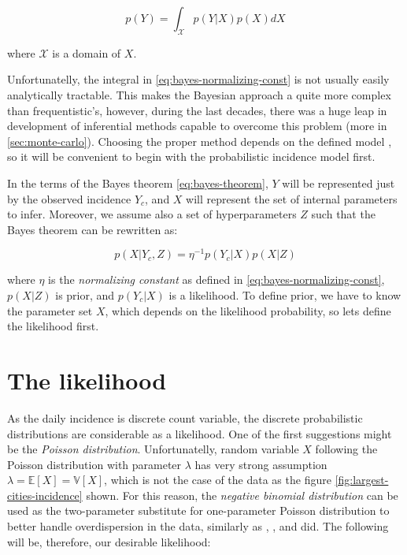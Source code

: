 \documentclass[
  digital, %
  oneside, %
  lof,     %
  lot,     %
]{fithesis4}
\begin{document}
\begin{equation}\label{eq:bayes-normalizing-const}
  p(Y) = \int_\mathcal{X} p( Y | X ) p(X) dX
\end{equation}

where $\mathcal{X}$ is a domain of $X$.

Unfortunatelly, the integral in 
\eqref{eq:bayes-normalizing-const} is not usually
easily analytically tractable.
This makes the Bayesian approach a quite more
complex than frequentistic's, 
however, during the last decades, there was a huge leap 
in development of inferential methods capable to
overcome this problem (more in \autoref{sec:monte-carlo}). 
Choosing the proper method depends on the 
defined model \cite{pfeffer2016}, so it will be 
convenient to begin with the probabilistic
incidence model first.


In the terms of the Bayes theorem \eqref{eq:bayes-theorem},
$Y$ will be represented just by the observed incidence $Y_c$, and
$X$ will represent the set of internal parameters to infer.
Moreover, we assume also a set of hyperparameters $Z$ such that
the Bayes theorem can be rewritten as:

\begin{equation}\label{eq:bayes-theorem-customized}
  p( X | Y_c, Z ) = \eta^{-1} p( Y_c | X ) p(X | Z)
\end{equation}

where $\eta$ is the \textit{normalizing constant} as
defined in \eqref{eq:bayes-normalizing-const},
$p(X | Z)$ is prior, and $p( Y_c | X )$ is a likelihood.
To define prior, we have to know the parameter set $X$, which
depends on the likelihood probability, so lets define 
the likelihood first.


\section{The likelihood}

As the daily incidence is discrete count variable, 
the discrete probabilistic distributions are 
considerable as a likelihood. One of the first suggestions 
might be the \textit{Poisson distribution}. Unfortunatelly, random 
variable $X$ following the Poisson distribution with 
parameter $\lambda$ has very strong assumption 
$\lambda = \mathbb{E}\left[ X \right] = \mathbb{V}\left[ X \right]$, 
which is not the case of the data as the 
figure \ref{fig:largest-cities-incidence} shown. 
For this reason, the \textit{negative binomial distribution} can 
be used as the two-parameter substitute for 
one-parameter Poisson distribution to better 
handle overdispersion in the data, similarly 
as \cite{simone2020}, \cite{wallinga2004}, 
\cite{alzahrani2018} and \cite{manevski2020} did.
The following will be, therefore, our
desirable likelihood:
\end{document}
